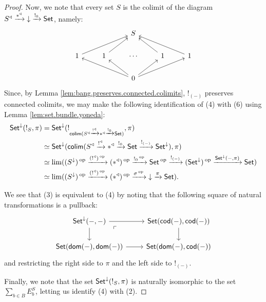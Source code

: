 \begin{proof}
Now, we note that every set $S$ is the colimit of the diagram $S^{\triangleleft}
\xrightarrow{\ast^{\triangleleft}}\mathbin{\downarrow} \xrightarrow{!_0} \operatorname{\mathsf{{Set}}}$, namely:
\[
\begin{tikzcd}
              &              & S                                               &              &               \\
1 \arrow[rru] & 1 \arrow[ru] & \cdots                                          & 1 \arrow[lu] & 1 \arrow[llu] \\
              &              & 0 \arrow[llu] \arrow[lu] \arrow[ru] \arrow[rru] &              &              
\end{tikzcd}
\]
Since, by Lemma \ref{lem:bang.preserves.connected.colimits}, $!_{(-)}$
preserves connected colimits, we may make the following identification of (4)
with (6) using Lemma \ref{lem:set.bundle.yoneda}: 
\begin{align*}
  \operatorname{\mathsf{{Set}}}^{\mathbin{\downarrow}}(!_S, \pi) &= \operatorname{\mathsf{{Set}}}^{\mathbin{\downarrow}}(!_{\operatorname{\mathsf{colim}}(S^{\triangleleft} \xrightarrow{!^{\triangleleft}} \ast^{\triangleleft} \xrightarrow{!_0} \operatorname{\mathsf{{Set}}})}, \pi) \\
  &\simeq \operatorname{\mathsf{{Set}}}^{\mathbin{\downarrow}}(\operatorname{\mathsf{colim}}(S^{\triangleleft} \xrightarrow{!^{\triangleleft}} \ast^{\triangleleft} \xrightarrow{!_0} \operatorname{\mathsf{{Set}}} \xrightarrow{!_{(-)}} \operatorname{\mathsf{{Set}}}^{\mathbin{\downarrow}}), \pi)\\
&\simeq \lim((S^{\mathbin{\downarrow}})\operatorname{^\textnormal{op}} \xrightarrow{(!^{\triangleleft})\operatorname{^\textnormal{op}}} (\ast^{\triangleleft})\operatorname{^\textnormal{op}} \xrightarrow{!_0\operatorname{^\textnormal{op}}} \operatorname{\mathsf{{Set}}}\operatorname{^\textnormal{op}} \xrightarrow{!_{(-)}} (\operatorname{\mathsf{{Set}}}^{\mathbin{\downarrow}})\operatorname{^\textnormal{op}} \xrightarrow{\operatorname{\mathsf{{Set}}}^{\mathbin{\downarrow}}(-, \pi)} \operatorname{\mathsf{{Set}}}) \\
&\simeq \lim((S^{\mathbin{\downarrow}})\operatorname{^\textnormal{op}} \xrightarrow{(!^{\triangleleft})\operatorname{^\textnormal{op}}} (\ast^{\triangleleft})\operatorname{^\textnormal{op}} \xrightarrow{\sigma\operatorname{^\textnormal{op}}} \mathbin{\downarrow} \xrightarrow{\pi} \operatorname{\mathsf{{Set}}}).
\end{align*}

We see that (3) is equivalent to (4) by noting that the following square of
natural transformations is a pullback:
\[
\begin{tikzcd}
{\Set^{\downarrow}(-, -)} \arrow[d] \arrow[r] \arrow[rd, phantom, "\ulcorner" very near start] & {\Set(\cod(-), \cod(-))} \arrow[d] \\
{\Set(\dom(-), \dom(-))} \arrow[r]                       & {\Set(\dom(-), \cod(-))}          
\end{tikzcd}
\]
and restricting the right side to $\pi$ and the left side to $!_{(-)}$.

Finally, we note that the set $\operatorname{\mathsf{{Set}}}^{\mathbin{\downarrow}}(!_S, \pi)$ is naturally
isomorphic to the set $\sum_{b \in B} E_b^S$, letting us identify (4) with (2).
\end{proof}

